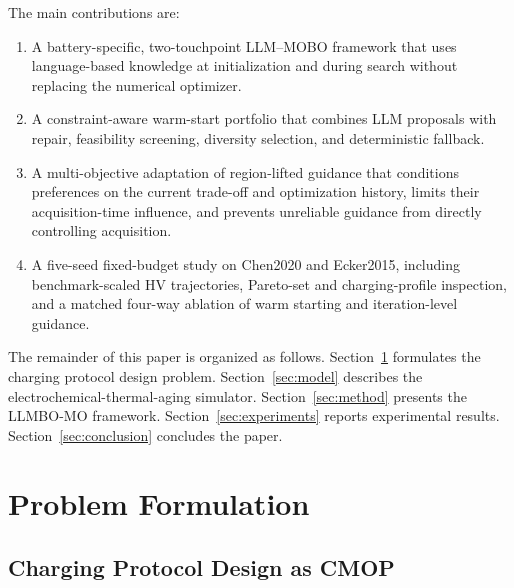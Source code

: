 \documentclass[journal]{IEEEtran}
\begin{document}
The main contributions are:
\begin{enumerate}
\item A battery-specific, two-touchpoint LLM--MOBO framework that uses language-based knowledge at initialization and during search without replacing the numerical optimizer.
\item A constraint-aware warm-start portfolio that combines LLM proposals with repair, feasibility screening, diversity selection, and deterministic fallback.
\item A multi-objective adaptation of region-lifted guidance that conditions preferences on the current trade-off and optimization history, limits their acquisition-time influence, and prevents unreliable guidance from directly controlling acquisition.
\item A five-seed fixed-budget study on Chen2020 and Ecker2015, including benchmark-scaled HV trajectories, Pareto-set and charging-profile inspection, and a matched four-way ablation of warm starting and iteration-level guidance.
\end{enumerate}

The remainder of this paper is organized as follows. Section~\ref{sec:problem} formulates the charging protocol design problem. Section~\ref{sec:model} describes the electrochemical-thermal-aging simulator. Section~\ref{sec:method} presents the LLMBO-MO framework. Section~\ref{sec:experiments} reports experimental results. Section~\ref{sec:conclusion} concludes the paper.

\section{Problem Formulation}
\label{sec:problem}

\subsection{Charging Protocol Design as CMOP}
\end{document}
